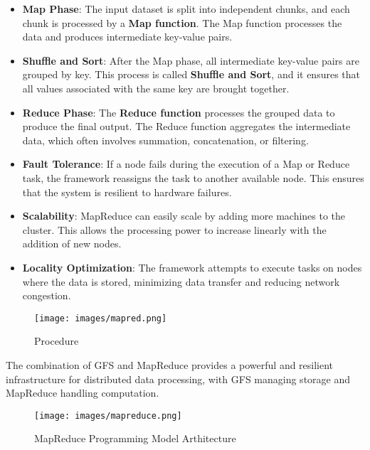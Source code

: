 \documentclass[12pt]{article}
\begin{document}
\begin{itemize}
    \item \textbf{Map Phase}: The input dataset is split into independent chunks, and each chunk is processed by a \textbf{Map function}. The Map function processes the data and produces intermediate key-value pairs.
    
    \item \textbf{Shuffle and Sort}: After the Map phase, all intermediate key-value pairs are grouped by key. This process is called \textbf{Shuffle and Sort}, and it ensures that all values associated with the same key are brought together.
    
    \item \textbf{Reduce Phase}: The \textbf{Reduce function} processes the grouped data to produce the final output. The Reduce function aggregates the intermediate data, which often involves summation, concatenation, or filtering.

    \item \textbf{Fault Tolerance}: If a node fails during the execution of a Map or Reduce task, the framework reassigns the task to another available node. This ensures that the system is resilient to hardware failures.

    \item \textbf{Scalability}: MapReduce can easily scale by adding more machines to the cluster. This allows the processing power to increase linearly with the addition of new nodes.

    \item \textbf{Locality Optimization}: The framework attempts to execute tasks on nodes where the data is stored, minimizing data transfer and reducing network congestion.
\end{itemize}

\begin{figure}[htbp]
    \centering
    \texttt{[image: images/mapred.png]}
    \caption{Procedure}
    \label{fig:gfs}
\end{figure}


The combination of GFS and MapReduce provides a powerful and resilient infrastructure for distributed data processing, with GFS managing storage and MapReduce handling computation.
\begin{figure}[htbp]
    \centering
    \texttt{[image: images/mapreduce.png]}
    \caption{MapReduce Programming Model Arthitecture}
    \label{fig:gfs}
\end{figure}
\end{document}
